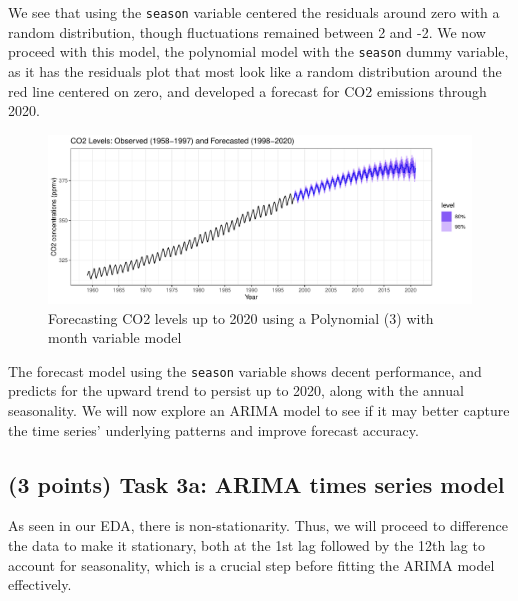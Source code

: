 \documentclass[
]{article}
\begin{document}
We see that using the \texttt{season} variable centered the residuals around zero with a random distribution, though fluctuations remained between 2 and -2. We now proceed with this model, the polynomial model with the \texttt{season} dummy variable, as it has the residuals plot that most look like a random distribution around the red line centered on zero, and developed a forecast for CO2 emissions through 2020.

\begin{figure}

{\centering \includegraphics[width=1\linewidth]{lab_prompt_Updated_files/figure-latex/forecasting-model-1} 

}

\caption{Forecasting CO2 levels up to 2020 using a Polynomial (3) with month variable model}\label{fig:forecasting-model}
\end{figure}

The forecast model using the \texttt{season} variable shows decent performance, and predicts for the upward trend to persist up to 2020, along with the annual seasonality. We will now explore an ARIMA model to see if it may better capture the time series' underlying patterns and improve forecast accuracy.

\subsection{(3 points) Task 3a: ARIMA times series model}\label{points-task-3a-arima-times-series-model}

As seen in our EDA, there is non-stationarity. Thus, we will proceed to difference the data to make it stationary, both at the 1st lag followed by the 12th lag to account for seasonality, which is a crucial step before fitting the ARIMA model effectively.
\end{document}
